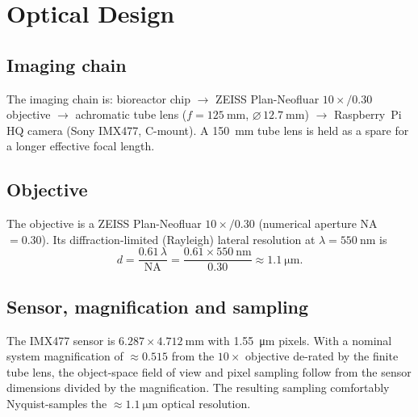 \section{Optical Design}
\label{sec:optical}

\subsection{Imaging chain}
The imaging chain is: bioreactor chip $\rightarrow$ ZEISS Plan-Neofluar
$10\times/0.30$ objective $\rightarrow$ achromatic tube lens
($f = \SI{125}{\milli\meter}$, $\varnothing\,\SI{12.7}{\milli\meter}$)
$\rightarrow$ Raspberry~Pi HQ camera (Sony IMX477, C-mount). A
\SI{150}{\milli\meter} tube lens is held as a spare for a longer effective focal
length.

\subsection{Objective}
The objective is a ZEISS Plan-Neofluar $10\times/0.30$ (numerical aperture
NA~$=0.30$). Its diffraction-limited (Rayleigh) lateral resolution at
$\lambda = \SI{550}{\nano\meter}$ is
\begin{equation}
  d = \frac{0.61\,\lambda}{\mathrm{NA}}
    = \frac{0.61 \times \SI{550}{\nano\meter}}{0.30}
    \approx \SI{1.1}{\micro\meter}.
  \label{eq:rayleigh}
\end{equation}

\subsection{Sensor, magnification and sampling}
The IMX477 sensor is $6.287 \times \SI{4.712}{\milli\meter}$ with
\SI{1.55}{\micro\meter} pixels. With a nominal system magnification of
$\approx 0.515$ from the $10\times$ objective de-rated by the finite tube lens,
the object-space field of view and pixel sampling follow from the sensor
dimensions divided by the magnification. The resulting sampling comfortably
Nyquist-samples the $\approx\SI{1.1}{\micro\meter}$ optical resolution.

